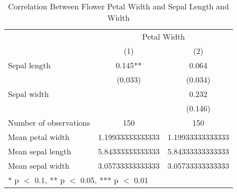 \begin{table}[H]
\caption{Correlation Between Flower Petal Width and Sepal Length and Width} 
\label{tab:flower_table}
\centering
\begin{tabular}[t]{lcc}
\toprule
& \multicolumn{2}{c}{Petal Width} \\
  & (1) & (2)\\
\midrule
Sepal length & 0.145** & 0.064\\
 & (0.033) & (0.034)\\
Sepal width &  & 0.232\\
 &  & (0.146)\\
\midrule
Number of observations & 150 & 150\\
Mean petal width & 1.19933333333333 & 1.19933333333333\\
Mean sepal length & 5.84333333333333 & 5.84333333333333\\
Mean sepal width & 3.05733333333333 & 3.05733333333333\\
\bottomrule
\multicolumn{3}{l}{\rule{0pt}{1em}* p $<$ 0.1, ** p $<$ 0.05, *** p $<$ 0.01}\\
\end{tabular}
\end{table}
